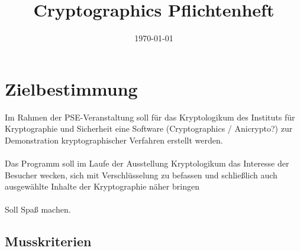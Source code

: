 \documentclass{article}
\title{Cryptographics Pflichtenheft}
\author{}
\date{\today}
\begin{document}
\maketitle
\tableofcontents
\newpage

\section{Zielbestimmung}

Im Rahmen der PSE-Veranstaltung soll für das Kryptologikum des Instituts für 
Kryptographie und Sicherheit eine Software (Cryptographics / Anicrypto?) zur 
Demonstration kryptographischer Verfahren erstellt werden. \\
\\
Das Programm soll im Laufe der Ausstellung Kryptologikum das 
Interesse der Besucher wecken, 
sich mit Verschlüsselung zu befassen und 
schließlich auch ausgewählte Inhalte der Kryptographie näher bringen
\\
\\
Soll Spaß machen.

\subsection{Musskriterien}
\end{document}
